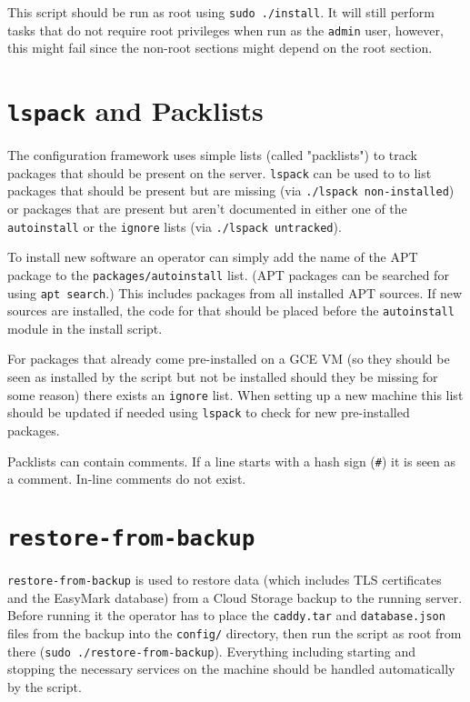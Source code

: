 \documentclass[12pt,a4paper]{report}
\begin{document}
	This script should be run as root using \lstinline|sudo ./install|. It will still perform tasks that do not require root privileges when run as the \lstinline|admin| user, however, this might fail since the non-root sections might depend on the root section.

	\section{\lstinline|lspack| and Packlists}
	The configuration framework uses simple lists (called "packlists") to track packages that should be present on the server. \lstinline|lspack| can be used to to list packages that should be present but are missing (via \lstinline|./lspack non-installed|) or packages that are present but aren't documented in either one of the \lstinline|autoinstall| or the \lstinline|ignore| lists (via \lstinline|./lspack untracked|).

	To install new software an operator can simply add the name of the APT package to the \lstinline|packages/autoinstall| list. (APT packages can be searched for using \lstinline|apt search|.) This includes packages from all installed APT sources. If new sources are installed, the code for that should be placed before the \lstinline|autoinstall| module in the install script.

	For packages that already come pre-installed on a GCE VM (so they should be seen as installed by the script but not be installed should they be missing for some reason) there exists an \lstinline|ignore| list. When setting up a new machine this list should be updated if needed using \lstinline|lspack| to check for new pre-installed packages.

	Packlists can contain comments. If a line starts with a hash sign (\lstinline|#|) it is seen as a comment. In-line comments do not exist.

	\pagebreak
	\section{\lstinline|restore-from-backup|}
	\lstinline|restore-from-backup| is used to restore data (which includes TLS certificates and the EasyMark database) from a Cloud Storage backup to the running server. Before running it the operator has to place the \lstinline|caddy.tar| and \lstinline|database.json| files from the backup into the \lstinline|config/| directory, then run the script as root from there (\lstinline|sudo ./restore-from-backup|). Everything including starting and stopping the necessary services on the machine should be handled automatically by the script.
\end{document}
